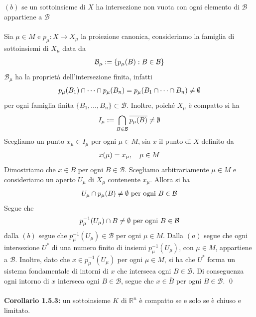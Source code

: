 \documentclass{article}
\begin{document}
$(b)$ se un sottoinsieme di $X$ ha intersezione non vuota con ogni elemento di $\mathcal{B}$ appartiene a $\mathcal{B}$ \\ \\
Sia $\mu \in M$ e $p_\mu : X \longrightarrow X_\mu$ la proiezione canonica, consideriamo la famiglia di sottoinsiemi di $X_\mu$ data da
\begin{gather}
    \mathcal{B}_\mu := \{ p_\mu(B) : B \in \mathcal{B} \} \notag
\end{gather}
$\mathcal{B}_\mu$ ha la proprietà dell'intersezione finita, infatti
\begin{gather}
    p_\mu(B_1) \cap \dots \cap p_\mu(B_n) = p_\mu(B_1 \cap \dots \cap B_n) \neq \emptyset \notag
\end{gather}
per ogni famiglia finita $\{ B_1, \dots, B_n \} \subset \mathcal{B}$. Inoltre, poiché $X_\mu$ è compatto si ha
\begin{gather}
    I_\mu := \bigcap_{B \in \mathcal{B}} \overline{p_\mu(B)} \neq \emptyset \notag
\end{gather}
Scegliamo un punto $x_\mu \in I_\mu$ per ogni $\mu \in M$, sia $x$ il punto di $X$ definito da
\begin{gather}
    x(\mu) = x_\mu, \quad \mu \in M \notag
\end{gather}
Dimostriamo che $x \in \overline{B}$ per ogni $B \in \mathcal{B}$. Scegliamo arbitrariamente $\mu \in M$ e consideriamo un aperto $U_\mu$ di $X_\mu$ contenente $x_\mu$. Allora si ha
\begin{gather}
    U_\mu \cap p_\mu(B) \neq \emptyset \text{ per ogni } B \in \mathcal{B} \notag
\end{gather}
Segue che
\begin{gather}
    p_\mu^{-1}(U_\mu) \cap B \neq \emptyset \text{ per ogni } B \in \mathcal{B} \notag
\end{gather}
dalla $(b)$ segue che $p_\mu^{-1}(U_\mu) \in \mathcal{B}$ per ogni $\mu \in M$. Dalla $(a)$ segue che ogni intersezione $U^*$ di una numero finito di insiemi $p_\mu^{-1}(U_\mu)$, con $\mu \in M$, appartiene a $\mathcal{B}$. Inoltre, dato che $x \in p_\mu^{-1}(U_\mu)$ per ogni $\mu \in M$, si ha che $U^*$ forma un sistema fondamentale di intorni di $x$ che interseca ogni $B \in \mathcal{B}$. Di conseguenza ogni intorno di $x$ interseca ogni $B \in \mathcal{B}$, segue che $x \in \overline{B}$ per ogni $B \in \mathcal{B}$. \qed \\ \\
\textbf{Corollario 1.5.3:} un sottoinsieme $K$ di $\mathbb{R}^n$ è compatto se e solo se è chiuso e limitato. \\
\end{document}
